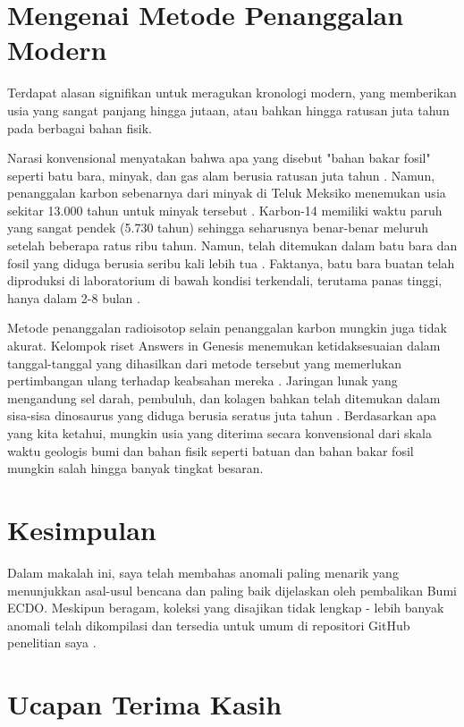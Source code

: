 \documentclass[10pt,twocolumn,letterpaper]{article}
\begin{document}
\section{Mengenai Metode Penanggalan Modern}

Terdapat alasan signifikan untuk meragukan kronologi modern, yang memberikan usia yang sangat panjang hingga jutaan, atau bahkan hingga ratusan juta tahun pada berbagai bahan fisik.

Narasi konvensional menyatakan bahwa apa yang disebut "bahan bakar fosil" seperti batu bara, minyak, dan gas alam berusia ratusan juta tahun \cite{104}. Namun, penanggalan karbon sebenarnya dari minyak di Teluk Meksiko menemukan usia sekitar 13.000 tahun untuk minyak tersebut \cite{105}. Karbon-14 memiliki waktu paruh yang sangat pendek (5.730 tahun) sehingga seharusnya benar-benar meluruh setelah beberapa ratus ribu tahun. Namun, telah ditemukan dalam batu bara dan fosil yang diduga berusia seribu kali lebih tua \cite{106}. Faktanya, batu bara buatan telah diproduksi di laboratorium di bawah kondisi terkendali, terutama panas tinggi, hanya dalam 2-8 bulan \cite{107}.

Metode penanggalan radioisotop selain penanggalan karbon mungkin juga tidak akurat. Kelompok riset Answers in Genesis menemukan ketidaksesuaian dalam tanggal-tanggal yang dihasilkan dari metode tersebut yang memerlukan pertimbangan ulang terhadap keabsahan mereka \cite{108}. Jaringan lunak yang mengandung sel darah, pembuluh, dan kolagen bahkan telah ditemukan dalam sisa-sisa dinosaurus yang diduga berusia seratus juta tahun \cite{109,110}. Berdasarkan apa yang kita ketahui, mungkin usia yang diterima secara konvensional dari skala waktu geologis bumi dan bahan fisik seperti batuan dan bahan bakar fosil mungkin salah hingga banyak tingkat besaran.

\section{Kesimpulan}

Dalam makalah ini, saya telah membahas anomali paling menarik yang menunjukkan asal-usul bencana dan paling baik dijelaskan oleh pembalikan Bumi ECDO. Meskipun beragam, koleksi yang disajikan tidak lengkap - lebih banyak anomali telah dikompilasi dan tersedia untuk umum di repositori GitHub penelitian saya \cite{2}.

\section{Ucapan Terima Kasih}
\end{document}

